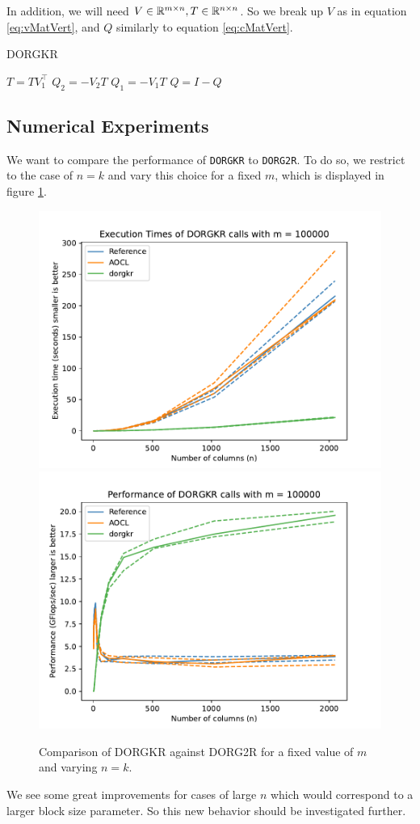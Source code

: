 \documentclass[12pt]{article}
\begin{document}
    In addition, we will need $V\in\mathbb{R}^{m\times n}, T\in\mathbb{R}^{n\times n}$. So we break up $V$ as in equation 
    \ref{eq:vMatVert}, and $Q$ similarly to equation \ref{eq:cMatVert}.
    \begin{algorithm}
        \caption{DORGKR}\label{alg:dorgkr}
        \begin{algorithmic}[1]
            \STATE $T = TV_1^\top$
            \STATE $Q_2 = -V_2T$
            \STATE $Q_1 = -V_1T$
            \STATE $Q = I - Q$
        \end{algorithmic}
    \end{algorithm}
    \subsection{Numerical Experiments}
    We want to compare the performance of \verb|DORGKR| to \verb|DORG2R|. To do so, we restrict to the case of 
    $n=k$ and vary this choice for a fixed $m$, which is displayed in figure \ref{fig:DORGKR}.

    \begin{figure}
        \centering
        \includegraphics[width=.45\textwidth]{figures/timeDORGKR.pdf}
        \includegraphics[width=.45\textwidth]{figures/flopDORGKR.pdf}
        \caption{Comparison of DORGKR against DORG2R for a fixed value of $m$ and varying $n=k$.}\label{fig:DORGKR}
    \end{figure}

    We see some great improvements for cases of large $n$ which would correspond to a larger block size parameter.
    So this new behavior should be investigated further.
\end{document}
